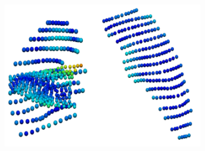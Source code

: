 {\begin{figure}[htbp] 
\centering
\begin{subfigure}{.3\linewidth}%
  \includegraphics[width=\linewidth,trim={{.0\wd0} {.0\wd0} {.0\wd0} {.0\wd0}},clip]{Segmentation/Image/QuanlititativeResult1.png} %
  \caption{}
  \label{fig:QuanlititativeResult-a} 
\end{subfigure} 
\begin{subfigure}{.3\linewidth}%

\end{subfigure}
\end{figure}}
